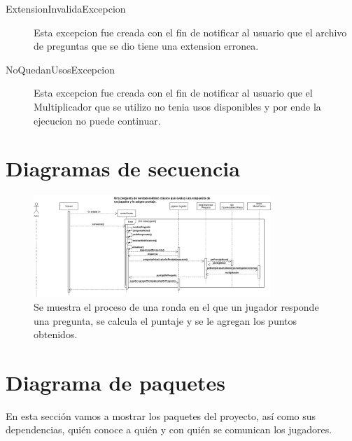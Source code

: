 \documentclass[titlepage,a4paper]{article}
\begin{document}
\begin{description}
\item[ExtensionInvalidaExcepcion] Esta excepcion fue creada con el fin de notificar al usuario que el archivo de preguntas que se dio tiene una extension erronea.
\item[NoQuedanUsosExcepcion] Esta excepcion fue creada con el fin de notificar al usuario que el Multiplicador que se utilizo no tenia usos disponibles y por ende la ejecucion no puede continuar.
\end{description}

\section{Diagramas de secuencia}\label{sec:diagramasdesecuencia}

\begin{figure}[H]
\centering
\includegraphics[width=0.8\textwidth]{diagramaDeSecuencia.png}
\caption{\label{fig:seq01}Se muestra el proceso de una ronda en el que un jugador responde una pregunta, se calcula el puntaje y se le agregan los puntos obtenidos.}
\end{figure}

\section{Diagrama de paquetes}\label{sec:diagramasdepaquetes}
\newline
En esta sección vamos a mostrar los paquetes del proyecto, así como sus dependencias, quién conoce a quién y con quién se comunican los jugadores.
\end{document}

